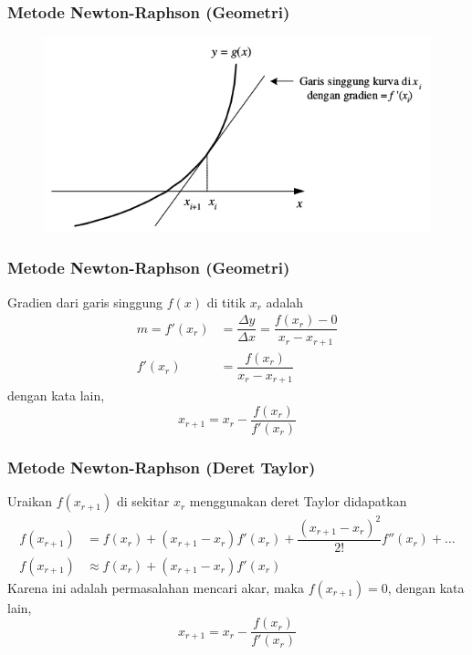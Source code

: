 \documentclass{beamer}
\begin{document}

\begin{frame}
\frametitle{Metode Newton-Raphson (Geometri)}
\begin{figure}[htp]
\centering
\includegraphics[scale=0.60]{NewtonRaphsonGeometri.png}
\end{figure}
\end{frame}


\begin{frame}
\frametitle{Metode Newton-Raphson (Geometri)}
Gradien dari garis singgung $f(x)$ di titik $x_r$ adalah
\begin{equation}
\begin{split}
m = f'(x_r) &= \dfrac{\Delta y}{\Delta x} = \dfrac{f(x_r)-0}{x_r - x_{r+1}}
\\f'(x_r) &= \dfrac{f(x_r)}{x_r - x_{r+1}}
\end{split}
\nonumber
\end{equation}
dengan kata lain, 
\begin{equation}
x_{r+1}  =x_r - \dfrac{f(x_r)}{f'(x_r)}
\nonumber
\end{equation}
\end{frame}


\begin{frame}
\frametitle{Metode Newton-Raphson (Deret Taylor)}
Uraikan $f(x_{r+1})$ di sekitar $x_r$ menggunakan deret Taylor didapatkan
\begin{equation}
\begin{split}
f(x_{r+1}) &= f(x_r)+ (x_{r+1}-x_r)f'(x_r)+\dfrac{(x_{r+1}-x_r)^2}{2!}f''(x_r) + \dots\\
f(x_{r+1}) &\approx f(x_r)+ (x_{r+1}-x_r)f'(x_r)
\end{split}
\nonumber
\end{equation}
Karena ini adalah permasalahan mencari akar, maka $f(x_{r+1})=0$, dengan kata lain, 
\begin{equation}
x_{r+1}  =x_r - \dfrac{f(x_r)}{f'(x_r)}
\nonumber
\end{equation}
\end{frame}
\end{document}
